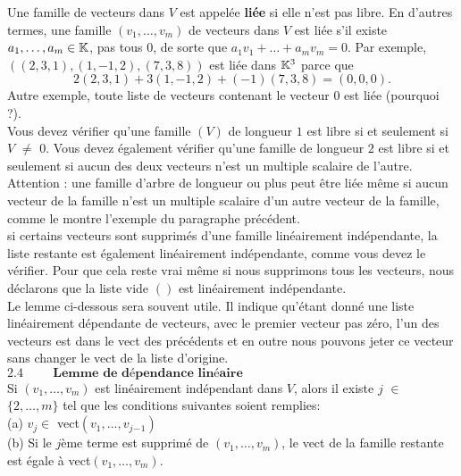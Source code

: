 \documentclass[12pt]{book}
\begin{document}
\indent
Une famille de vecteurs dans $V$ est appel\'ee \textbf{ li\'ee } si elle n’est pas libre. En d’autres termes, une famille $(v_1,\ldots,v_m)$ de vecteurs dans $V$ est li\'ee s’il existe $a_1,\ldots,a_m \in \mathbb{K}$, pas tous $0$, de sorte que $a_1v_1 +\ldots+ a_mv_m = 0$. Par exemple, $((2,3,1),(1,-1,2),(7,3,8))$ est li\'ee dans $\mathbb{K}^3$ parce que
\begin{equation*}
2(2,3,1) + 3(1,-1,2) + (-1)(7,3,8) = (0,0,0).
\end{equation*}
Autre exemple, toute liste de vecteurs contenant le vecteur $0$ est li\'ee (pourquoi ?).\\
\indent
Vous devez v\'erifier qu’une famille $(V)$ de longueur $1$ est libre si et seulement si $V$ $\ne$ $0$. Vous devez \'egalement v\'erifier qu’une famille de longueur $2$ est libre si et seulement si aucun des deux vecteurs n’est un multiple scalaire de l’autre. Attention : une famille d’arbre de longueur ou plus peut \^etre li\'ee m\^eme si aucun vecteur de la famille n’est un multiple scalaire d’un autre vecteur de la famille, comme le montre l’exemple du paragraphe pr\'ec\'edent.\\
\indent
si certains vecteurs sont supprim\'es d’une famille lin\'eairement ind\'ependante, la liste restante est \'egalement lin\'eairement ind\'ependante, comme vous devez le v\'erifier. Pour que cela reste vrai m\^eme si nous supprimons tous les vecteurs, nous d\'eclarons que la liste vide $()$ est linéairement indépendante.\\
\indent
Le lemme ci-dessous sera souvent utile. Il indique qu’\'etant donné une liste lin\'eairement d\'ependante de vecteurs, avec le premier vecteur pas z\'ero, l’un des vecteurs est dans le vect des pr\'ec\'edents et en outre nous pouvons jeter ce vecteur sans changer le vect de la liste d’origine.\\
$ \bm{2.4} \hspace{1cm} \textbf{Lemme de dépendance lin\'eaire} $\\
Si $(v_1,\ldots,v_m)$ est lin\'eairement ind\'ependant dans $V$, alors il existe $j$ $\in$ $\{2,\ldots,m\}$ tel que les conditions suivantes soient remplies:\\
(a)\hspace{1cm} $v_j \in$ vect$(v_1,\ldots,v_j{_-}_1)$\\
(b)\hspace{1cm} Si le $j$\`eme terme est supprim\'e de $(v_1,\ldots,v_m)$, le vect de la famille restante est égale à vect$(v_1,\ldots,v_m)$.\\
\end{document}
